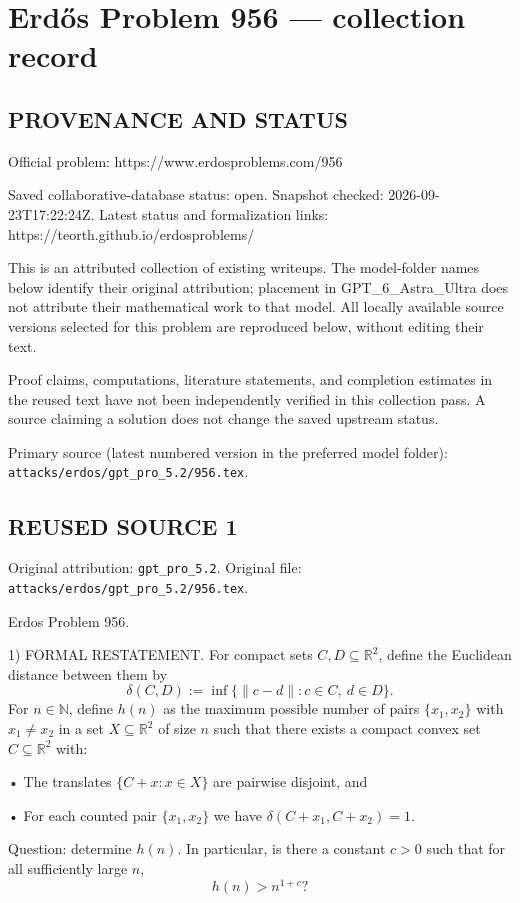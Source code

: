 \section*{Erd\H{o}s Problem 956 --- collection record}

\subsection*{PROVENANCE AND STATUS}
Official problem: https://www.erdosproblems.com/956

Saved collaborative-database status: open.
Snapshot checked: 2026-09-23T17:22:24Z.
Latest status and formalization links: https://teorth.github.io/erdosproblems/

This is an attributed collection of existing writeups. The model-folder names below identify their original attribution; placement in GPT\_6\_Astra\_Ultra does not attribute their mathematical work to that model. All locally available source versions selected for this problem are reproduced below, without editing their text.

Proof claims, computations, literature statements, and completion estimates in the reused text have not been independently verified in this collection pass. A source claiming a solution does not change the saved upstream status.

Primary source (latest numbered version in the preferred model folder): \texttt{attacks/erdos/gpt\_pro\_5.2/956.tex}.

\subsection*{REUSED SOURCE 1}
Original attribution: \texttt{gpt\_pro\_5.2}.
Original file: \texttt{attacks/erdos/gpt\_pro\_5.2/956.tex}.


Erdos Problem 956.

1) FORMAL RESTATEMENT.
For compact sets $C,D\subseteq\mathbb{R}^2$, define the Euclidean distance between them by
\[
\delta(C,D):=\inf\{\|c-d\|: c\in C,\ d\in D\}.
\]
For $n\in\mathbb{N}$, define $h(n)$ as the maximum possible number of pairs $\{x_1,x_2\}$ with $x_1\ne x_2$ in a set $X\subseteq\mathbb{R}^2$ of size $n$ such that there exists a compact convex set $C\subseteq\mathbb{R}^2$ with:

• The translates $\{C+x: x\in X\}$ are pairwise disjoint, and

• For each counted pair $\{x_1,x_2\}$ we have $\delta(C+x_1, C+x_2)=1$.

Question: determine $h(n)$. In particular, is there a constant $c>0$ such that for all sufficiently large $n$,
\[
 h(n) > n^{1+c}?
\]

